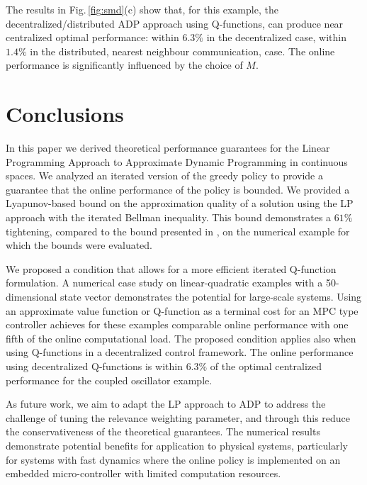 \documentclass[journal]{IEEEtran}
\newcommand{\textQ}{Q}
\begin{document}
The results in Fig.\,\ref{fig:smd}(c) show that, for this example, the decentralized/distributed ADP approach using \textQ-functions, can produce near centralized optimal performance: within $6.3\%$ in the decentralized case, within $1.4\%$ in the distributed, nearest neighbour communication, case. The online performance is significantly influenced by the choice of $M$. 



\section{Conclusions} \label{sec:conclusion}

In this paper we derived theoretical performance guarantees for the Linear Programming Approach to Approximate Dynamic Programming in continuous spaces.
We analyzed an iterated version of the greedy policy to provide a guarantee that the online performance of the policy is bounded.
We provided a Lyapunov-based bound on the approximation quality of a solution using the LP approach with the iterated Bellman inequality. This bound demonstrates a $61\%$ tightening, compared to the bound presented in \cite{boyd_iteratedBellman}, on the numerical example for which the bounds were evaluated.




We proposed a condition that allows for a more efficient iterated \textQ-function formulation. A numerical case study on linear-quadratic examples with a 50-dimensional state vector demonstrates the potential for large-scale systems.
Using an approximate value function or \textQ-function as a terminal cost for an MPC type controller achieves for these examples comparable online performance with one fifth of the online computational load.
The proposed condition applies also when using \textQ-functions in a decentralized control framework. The online performance using decentralized \textQ-functions is within $6.3\%$ of the optimal centralized performance for the coupled oscillator example.


As future work, we aim to adapt the LP approach to ADP to address the challenge of tuning the relevance weighting parameter, and through this reduce the conservativeness of the theoretical guarantees.
The numerical results demonstrate potential benefits for application to physical systems, particularly for systems with fast dynamics where the online policy is implemented on an embedded micro-controller with limited computation resources. 
\end{document}
